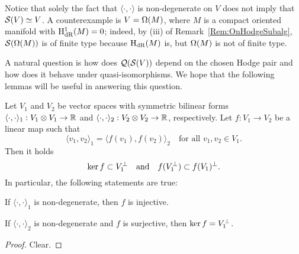 \documentclass[\MainFolder/Text.tex]{subfiles}
\begin{document}
Notice that solely the fact that $\langle\cdot,\cdot\rangle$ is non-degenerate on $V$ does not imply that $\mathcal{S}(V) \simeq V$. A counterexample is $V = \Omega(M)$, where $M$ is a compact oriented manifold with $\mathrm{H}_{\mathrm{dR}}^1(M) = 0$; indeed, by (iii) of Remark~\ref{Rem:OnHodgeSubalg}, $\mathcal{S}(\Omega(M))$ is of finite type because $\mathrm{H}_{\mathrm{dR}}(M)$ is, but $\Omega(M)$ is not of finite type.

A natural question is how does $\mathcal{Q}(\mathcal{S}(V))$ depend on the chosen Hodge pair and how does it behave under quasi-isomorphisms. We hope that the following lemmas will be useful in answering this question.

\begin{Lemma}\label{Lem:PomLemma}
Let $V_1$ and $V_2$ be vector spaces with symmetric bilinear forms $\langle \cdot,\cdot \rangle_1: V_1 \otimes V_1 \rightarrow \mathbb{R}$ and $\langle \cdot,\cdot\rangle_2: V_2\otimes V_2 \rightarrow \mathbb{R}$, respectively. Let $f: V_1 \rightarrow V_2$ be a linear map such that
\begin{equation}\label{Eq:Isometryyy}
\langle v_1, v_2 \rangle_1 = \langle f(v_1), f(v_2) \rangle_2 \quad \text{for all }v_1, v_2 \in V_1.
\end{equation}
Then it holds 
$$ \operatorname{ker} f \subset V_1^\perp\quad\text{and}\quad f(V_1^\perp)\subset f(V_1)^\perp. $$
In particular, the following statements are true:
\begin{ClaimList}
\item If $\langle\cdot,\cdot\rangle_1$ is non-degenerate, then $f$ is injective.
\item If $\langle\cdot,\cdot\rangle_2$ is non-degenerate and $f$ is surjective, then $\operatorname{ker} f = V_1^\perp$.
\end{ClaimList}
\end{Lemma}
\begin{proof}
Clear.
\end{proof}
\end{document}
